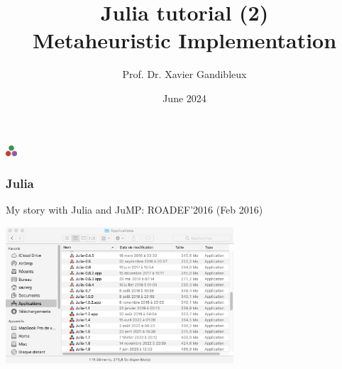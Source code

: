 \documentclass[]{beamer}
\title[Julia]{Julia tutorial (2)\\ \textbf{Metaheuristic Implementation}}
\date{June 2024}
\author{Prof. Dr. Xavier Gandibleux}\bigskip
\institute{Nantes Université, France}
\newcommand*{\blue}[1]{\textcolor{nblue}{#1}}
\begin{document}
% 
%

\begin{frame}
  \titlepage
  \vspace{-1cm}
\end{frame}


{ 
  \hfill \includegraphics[height=0.4cm]{logo3ptsJulia.png} \hfill
{}
\vskip4pt%
}


% 
%
\begin{frame}[fragile]
  \frametitle{Julia}
 \vspace{2mm}

My story with Julia and JuMP: \blue{ROADEF'2016 (Feb 2016)}
 \vspace{6mm}

\centerline{\includegraphics[width=8.5cm]{timelineJulia.png}}

\end{frame}
\end{document}
